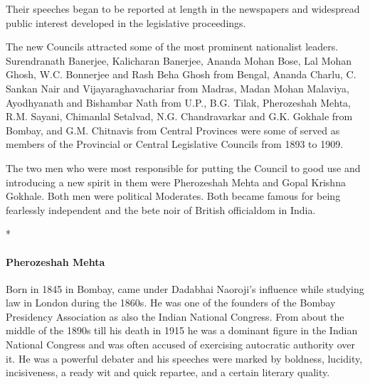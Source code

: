\begin{multicols}{2}
Their speeches began to be reported at length in the newspapers and widespread public interest developed in the legislative proceedings.

The new Councils attracted some of the most prominent nationalist leaders. Surendranath Banerjee, Kalicharan Banerjee, Ananda Mohan Bose, Lal Mohan Ghosh, W.C. Bonnerjee and Rash Beha Ghosh from Bengal, Ananda Charlu, C. Sankan Nair and Vijayaraghavachariar from Madras, Madan Mohan Malaviya, Ayodhyanath and Bishambar Nath from U.P., B.G. Tilak, Pherozeshah Mehta, R.M. Sayani, Chimanlal Setalvad, N.G. Chandravarkar and G.K. Gokhale from Bombay, and G.M. Chitnavis from Central Provinces were some of served as members of the Provincial or Central Legislative Councils from 1893 to 1909.

The two men who were most responsible for putting the Council to good use and introducing a new spirit in them were Pherozeshah Mehta and Gopal Krishna Gokhale. Both men were political Moderates. Both became famous for being fearlessly independent and the bete noir of British officialdom in India.

\begin{center}*\end{center}

\paragraph{Pherozeshah Mehta} Born in 1845 in Bombay, came under Dadabhai Naoroji's influence while studying law in London during the 1860s. He was one of the founders of the Bombay Presidency Association as also the Indian National Congress. From about the middle of the 1890s till his death in 1915 he was a dominant figure in the Indian National Congress and was often accused of exercising autocratic authority over it. He was a powerful debater and his speeches were marked by boldness, lucidity, incisiveness, a ready wit and quick repartee, and a certain literary quality.


\end{multicols}

